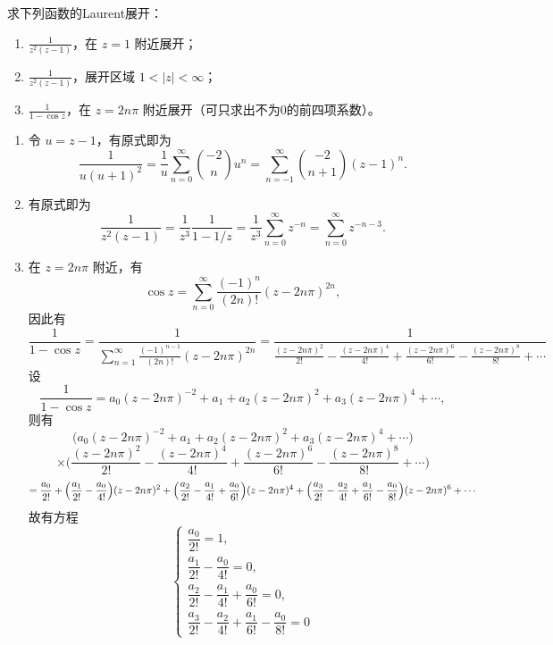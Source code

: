 
\begin{question}
求下列函数的Laurent展开：

\begin{enumerate}
  \item \(\displaystyle\frac{1}{z^2(z-1)}\)，在 \(z=1\) 附近展开；

  \item \(\displaystyle\frac{1}{z^2(z-1)}\)，展开区域 \(1<|z|<\infty\)；

  \item \(\displaystyle\frac{1}{1-\cos z}\)，在 \(z=2n\pi\) 附近展开（可只求出不为0的前四项系数）。

\end{enumerate}
\begin{solution}
\begin{enumerate}
  \item 令 \(u = z-1\)，有原式即为
\[
\frac{1}{u(u+1)^2} = \frac{1}{u} \sum_{n=0}^\infty \binom{-2}{n} u^n
= \sum_{n=-1}^\infty \binom{-2}{n+1} (z-1)^n.
\]

  \item 有原式即为
\[
\frac{1}{z^2(z-1)} = \frac{1}{z^3} \frac{1}{1-1/z}
= \frac{1}{z^3} \sum_{n=0}^\infty z^{-n}
= \sum_{n=0}^\infty z^{-n-3}.
\]

  \item 在 \(z=2n\pi\) 附近，有
\[
\cos z = \sum_{n=0}^\infty \frac{(-1)^n}{(2n)!} (z-2n\pi)^{2n},
\]
因此有
\[
\frac{1}{1-\cos z}
= \frac{1}{\displaystyle\sum_{n=1}^\infty \frac{(-1)^{n-1}}{(2n)!} (z-2n\pi)^{2n}}
= \frac{1}{\displaystyle\frac{(z-2n\pi)^2}{2!} - \frac{(z-2n\pi)^4}{4!} + \frac{(z-2n\pi)^6}{6!} - \frac{(z-2n\pi)^8}{8!} + \cdots}
\]
设
\[
\frac{1}{1-\cos z}
= a_0 (z-2n\pi)^{-2} + a_1 + a_2 (z-2n\pi)^2 + a_3 (z-2n\pi)^4 + \cdots,
\]
则有
\[
\bigl(a_0 (z-2n\pi)^{-2}+a_1+a_2 (z-2n\pi)^2+a_3 (z-2n\pi)^4+\cdots\bigr)
\]
\[
\times \biggl(\frac{(z-2n\pi)^2}{2!}-\frac{(z-2n\pi)^4}{4!}+\frac{(z-2n\pi)^6}{6!}-\frac{(z-2n\pi)^8}{8!}+\cdots\biggr)
\]
\[
= \frac{a_0}{2!} + \Bigl(\frac{a_1}{2!}-\frac{a_0}{4!}\Bigr)(z-2n\pi)^2
+ \Bigl(\frac{a_2}{2!}-\frac{a_1}{4!}+\frac{a_0}{6!}\Bigr)(z-2n\pi)^4
+ \Bigl(\frac{a_3}{2!}-\frac{a_2}{4!}+\frac{a_1}{6!}-\frac{a_0}{8!}\Bigr)(z-2n\pi)^6+\cdots
\]
故有方程
\[
\begin{cases}
\dfrac{a_0}{2!} = 1,\\[6pt]
\dfrac{a_1}{2!} - \dfrac{a_0}{4!} = 0,\\[6pt]
\dfrac{a_2}{2!} - \dfrac{a_1}{4!} + \dfrac{a_0}{6!} = 0,\\[6pt]
\dfrac{a_3}{2!} - \dfrac{a_2}{4!} + \dfrac{a_1}{6!} - \dfrac{a_0}{8!} = 0
\end{cases}
\]


\end{enumerate}
\end{solution}
\end{question}
